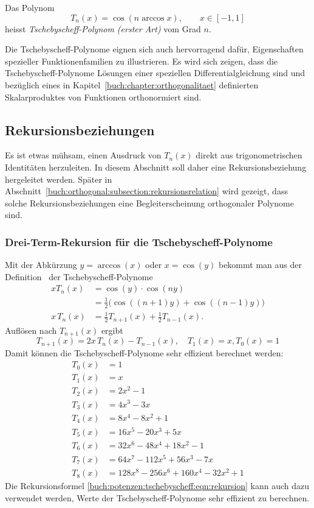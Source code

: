 \begin{definition}
\label{buch:potenzen:def:tschebyscheff}
Das Polynom
\[
T_n(x)
=
\cos (n\arccos x),
\qquad
x\in[-1,1]
\]
heisst
{\em Tschebyscheff-Polynom (erster Art)} vom Grad $n$.
\end{definition}
Die Tschebyscheff-Polynome eignen sich auch hervorragend
dafür, Eigenschaften spezieller Funktionenfamilien zu
illustrieren.
Es wird sich zeigen, dass die Tschebyscheff-Polynome
Lösungen einer speziellen Differentialgleichung sind und
bezüglich eines in Kapitel~\ref{buch:chapter:orthogonalitaet}
definierten Skalarproduktes von Funktionen orthonormiert sind.

\subsection{Rekursionsbeziehungen
\label{buch:potenzen:tschebyscheff:rekursionsbeziehungen}}
Es ist etwas mühsam, einen Ausdruck von $T_n(x)$ direkt aus
trigonometrischen Identitäten herzuleiten.
In diesem Abschnitt soll daher eine Rekursionsbeziehung
hergeleitet werden.
Später in Abschnitt~\ref{buch:orthogonal:subsection:rekursionsrelation}
wird gezeigt, dass solche Rekursionsbeziehungen eine Begleiterscheinung
orthogonaler Polynome sind.

\subsubsection{Drei-Term-Rekursion für die Tschebyscheff-Polynome}
Mit der Abkürzung $y=\arccos(x)$ oder $x=\cos(y)$ bekommt man aus
der Definition~\label{buch:potenzen:def:tschebyscheff}
der Tschebyscheff-Polynome
\begin{align*}
xT_n(x)
&=
\cos(y)\cdot \cos(ny)
\\
&=
\frac12\bigl(
\cos((n+1)y) + \cos((n-1)y)
\bigr)
\\
x\,T_n(x)
&=
\frac12 T_{n+1}(x) + \frac12 T_{n-1}(x).
\end{align*}
Auflösen nach $T_{n+1}(x)$ ergibt
\begin{equation}
T_{n+1}(x) = 2x\,T_n(x)-T_{n-1}(x),
\quad T_1(x)=x, T_0(x)=1
\label{buch:potenzen:tschebyscheff:eqn:rekursion}
\end{equation}
Damit können die Tschebyscheff-Polynome sehr effizient berechnet werden:
\begin{equation}
\begin{aligned}
T_0(x)
&=1
\\
T_1(x)
&=
x
\\
T_2(x)
&=
2x^2-1
\\
T_3(x)
&=
4x^3-3x
\\
T_4(x)
&=
8x^4-8x^2+1
\\
T_5(x)
&=
16x^5-20x^3+5x
\\
T_6(x)
&=
32x^6-48x^4+18x^2-1
\\
T_7(x)
&=
64x^7-112x^5+56x^3-7x
\\
T_8(x)
&=
128x^8-256x^6+160x^4-32x^2+1
\end{aligned}
\end{equation}
Die Rekursionsformel
\eqref{buch:potenzen:tschebyscheff:eqn:rekursion}
kann auch dazu verwendet werden, Werte der Tschebyscheff-Polynome
sehr effizient zu berechnen.


